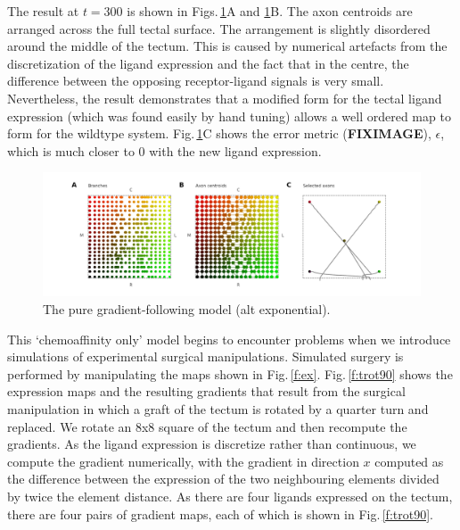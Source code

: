 \documentclass[11pt, a4paper]{article}
\begin{document}
The result at $t=300$ is shown in Figs.\,\ref{f:chalt}A
and \ref{f:chalt}B. The axon centroids are arranged across the full tectal
surface.  The arrangement is slightly disordered around the middle of the
tectum. This is caused by numerical artefacts from the discretization of the
ligand expression and the fact that in the centre, the difference between the
opposing receptor-ligand signals is very small. Nevertheless, the result
demonstrates that a modified form for the tectal ligand expression (which was
found easily by hand tuning) allows a well ordered map to form for the
wildtype system. Fig.\,\ref{f:chalt}C shows the error metric
(\textbf{FIXIMAGE}), $\epsilon$, which is much closer to 0 with the new ligand
expression.

\begin{figure}
\includegraphics[width=\linewidth]{./images/j4_eE_G_wt_fig3.png}
\caption{The pure gradient-following model (alt exponential).}
\label{f:chalt}
\end{figure}

This `chemoaffinity only' model begins to encounter problems when we introduce
simulations of experimental surgical manipulations. Simulated surgery is
performed by manipulating the maps shown in
Fig.\,\ref{f:ex}. Fig.\,\ref{f:trot90} shows the expression maps and the
resulting gradients that result from the surgical manipulation in which a
graft of the tectum is rotated by a quarter turn and replaced. We rotate an
8x8 square of the tectum and then recompute the gradients. As the ligand
expression is discretize rather than continuous, we compute the gradient
numerically, with the gradient in direction $x$ computed as the difference
between the expression of the two neighbouring elements divided by twice the
element distance. As there are four ligands expressed on the tectum, there are
four pairs of gradient maps, each of which is shown in Fig.\,\ref{f:trot90}.
\end{document}
